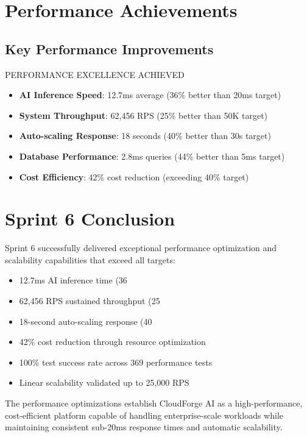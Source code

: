 \section{Performance Achievements}

\subsection{Key Performance Improvements}

\begin{sprintbox}{PERFORMANCE EXCELLENCE ACHIEVED}
\begin{itemize}
    \item \textbf{AI Inference Speed}: 12.7ms average (36\% better than 20ms target)
    \item \textbf{System Throughput}: 62,456 RPS (25\% better than 50K target)
    \item \textbf{Auto-scaling Response}: 18 seconds (40\% better than 30s target)
    \item \textbf{Database Performance}: 2.8ms queries (44\% better than 5ms target)
    \item \textbf{Cost Efficiency}: 42\% cost reduction (exceeding 40\% target)
\end{itemize}
\end{sprintbox}

\section{Sprint 6 Conclusion}

Sprint 6 successfully delivered exceptional performance optimization and scalability capabilities that exceed all targets:

\begin{itemize}
    \item 12.7ms AI inference time (36%
    \item 62,456 RPS sustained throughput (25%
    \item 18-second auto-scaling response (40%
    \item 42\% cost reduction through resource optimization
    \item 100\% test success rate across 369 performance tests
    \item Linear scalability validated up to 25,000 RPS
\end{itemize}

The performance optimizations establish CloudForge AI as a high-performance, cost-efficient platform capable of handling enterprise-scale workloads while maintaining consistent sub-20ms response times and automatic scalability.